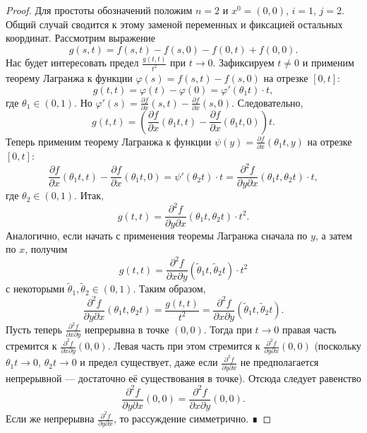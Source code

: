 \begin{proof}
Для простоты обозначений положим \(n=2\) и \(x^0=(0,0)\), \(i=1\), \(j=2\). Общий случай сводится к этому заменой переменных и фиксацией остальных координат. Рассмотрим выражение
\[
g(s,t) = f(s,t) - f(s,0) - f(0,t) + f(0,0).
\]
Нас будет интересовать предел \(\frac{g(t,t)}{t^2}\) при \(t\to 0\). Зафиксируем \(t \neq 0\) и применим теорему Лагранжа к функции \(\varphi(s) = f(s,t) - f(s,0)\) на отрезке \([0,t]\):
\[
g(t,t) = \varphi(t) - \varphi(0) = \varphi'(\theta_1 t) \cdot t,
\]
где \(\theta_1 \in (0,1)\). Но \(\varphi'(s) = \frac{\partial f}{\partial x}(s,t) - \frac{\partial f}{\partial x}(s,0)\). Следовательно,
\[
g(t,t) = \left( \frac{\partial f}{\partial x}(\theta_1 t, t) - \frac{\partial f}{\partial x}(\theta_1 t, 0) \right) t.
\]
Теперь применим теорему Лагранжа к функции \(\psi(y) = \frac{\partial f}{\partial x}(\theta_1 t, y)\) на отрезке \([0,t]\):
\[
\frac{\partial f}{\partial x}(\theta_1 t, t) - \frac{\partial f}{\partial x}(\theta_1 t, 0) = \psi'(\theta_2 t) \cdot t = \frac{\partial^2 f}{\partial y \partial x}(\theta_1 t, \theta_2 t) \cdot t,
\]
где \(\theta_2 \in (0,1)\). Итак,
\[
g(t,t) = \frac{\partial^2 f}{\partial y \partial x}(\theta_1 t, \theta_2 t) \cdot t^2.
\]
Аналогично, если начать с применения теоремы Лагранжа сначала по \(y\), а затем по \(x\), получим
\[
g(t,t) = \frac{\partial^2 f}{\partial x \partial y}(\tilde\theta_1 t, \tilde\theta_2 t) \cdot t^2
\]
с некоторыми \(\tilde\theta_1, \tilde\theta_2 \in (0,1)\). Таким образом,
\[
\frac{\partial^2 f}{\partial y \partial x}(\theta_1 t, \theta_2 t) = \frac{g(t,t)}{t^2} = \frac{\partial^2 f}{\partial x \partial y}(\tilde\theta_1 t, \tilde\theta_2 t).
\]
Пусть теперь \(\frac{\partial^2 f}{\partial x \partial y}\) непрерывна в точке \((0,0)\). Тогда при \(t\to 0\) правая часть стремится к \(\frac{\partial^2 f}{\partial x \partial y}(0,0)\). Левая часть при этом стремится к \(\frac{\partial^2 f}{\partial y \partial x}(0,0)\) (поскольку \(\theta_1 t \to 0\), \(\theta_2 t \to 0\) и предел существует, даже если \(\frac{\partial^2 f}{\partial y \partial x}\) не предполагается непрерывной — достаточно её существования в точке). Отсюда следует равенство
\[
\frac{\partial^2 f}{\partial y \partial x}(0,0) = \frac{\partial^2 f}{\partial x \partial y}(0,0).
\]
Если же непрерывна \(\frac{\partial^2 f}{\partial y \partial x}\), то рассуждение симметрично. ∎
\end{proof}



